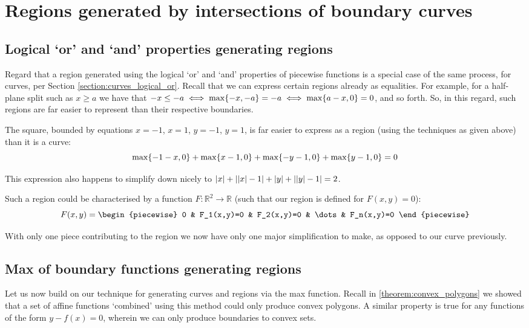 \section{Regions generated by intersections of boundary curves}
\subsection{Logical `or' and `and' properties generating regions}
Regard that a region generated using the logical `or' and `and' properties of piecewise functions is a special case of the same process, for curves, per Section \ref{section:curves_logical_or}. Recall that we can express certain regions already as equalities. For example, for a half-plane split such as $x\geq a$ we have that $-x\leq -a\iff\max\{-x,-a\}=-a\iff\max\{a-x,0\}=0$, and so forth. So, in this regard, such regions are far easier to represent than their respective boundaries.

\begin{example}
    The square, bounded by equations $x=-1$, $x=1$, $y=-1$, $y=1$, is far easier to express as a region (using the techniques as given above) than it is a curve:
    $$
        \max\{-1-x,0\}+\max\{x-1,0\}+\max\{-y-1,0\}+\max\{y-1,0\}=0
    $$

    This expression also happens to simplify down nicely to $\abs{x}+\abs{\abs{x}-1}+\abs{y}+\abs{\abs{y}-1}=2$.
\end{example}

Such a region could be characterised by a function $F:\mathbb{R}^2\to\mathbb{R}$ (such that our region is defined for $F(x,y)=0$):
$$
    F(x,y)=\begin{piecewise}
        0 & F_1(x,y)=0 & F_2(x,y)=0 & \dots & F_n(x,y)=0
    \end{piecewise}
$$

With only one piece contributing to the region we now have only one major simplification to make, as opposed to our curve previously.

\subsection{Max of boundary functions generating regions}
\label{section:max_boundary_region}
Let us now build on our technique for generating curves and regions via the max function. Recall in \ref{theorem:convex_polygons} we showed that a set of affine functions `combined' using this method could only produce convex polygons. A similar property is true for any functions of the form $y-f(x)=0$, wherein we can only produce boundaries to convex sets.

